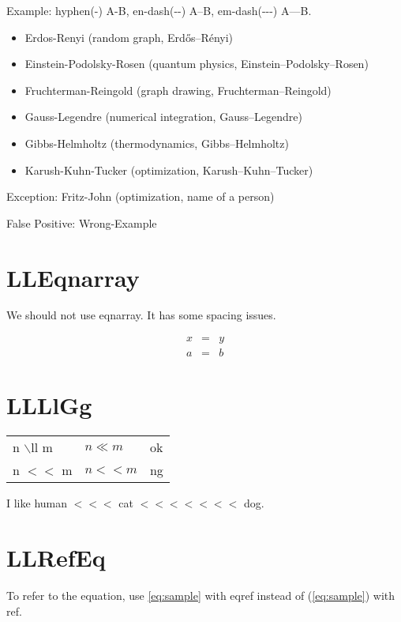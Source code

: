 \documentclass[a4paper, 10pt]{article}
\newcommand{\tA}[1]{\textcolor{cA}{#1}}
\newcommand{\tD}[1]{\textcolor{cD}{#1}}
\begin{document}
Example: hyphen(-) A-B, en-dash(-{}-) A--B, em-dash(-{}-{}-) A---B.

\begin{itemize}
	\item Erdos-Renyi (random graph, Erd\H{o}s--R\'enyi)
	\item Einstein-Podolsky-Rosen (quantum physics, Einstein--Podolsky--Rosen)
	\item Fruchterman-Reingold (graph drawing, Fruchterman--Reingold)
	\item Gauss-Legendre (numerical integration, Gauss--Legendre)
	\item Gibbs-Helmholtz (thermodynamics, Gibbs--Helmholtz)
	\item Karush-Kuhn-Tucker (optimization, Karush--Kuhn--Tucker)
\end{itemize}

Exception: Fritz-John (optimization, name of a person)

False Positive: Wrong-Example

\section{LLEqnarray}

We should not use eqnarray. It has some spacing issues.

\begin{eqnarray}
	x & = & y \\
	a & = & b
\end{eqnarray}

\section{LLLlGg}

\begin{table}[H]
	\centering
	\begin{tabular}{lll}
		n $\backslash$ll m & $n \ll m$ & \tA{ok} \\
		n $<<$ m           & $n<<m$    & \tD{ng} \\
	\end{tabular}
\end{table}

I like human $<<<$ cat $<<<<<<<$ dog.

\section{LLRefEq}

To refer to the equation, use \eqref{eq:sample} with eqref instead of (\ref{eq:sample}) with ref.
\end{document}
